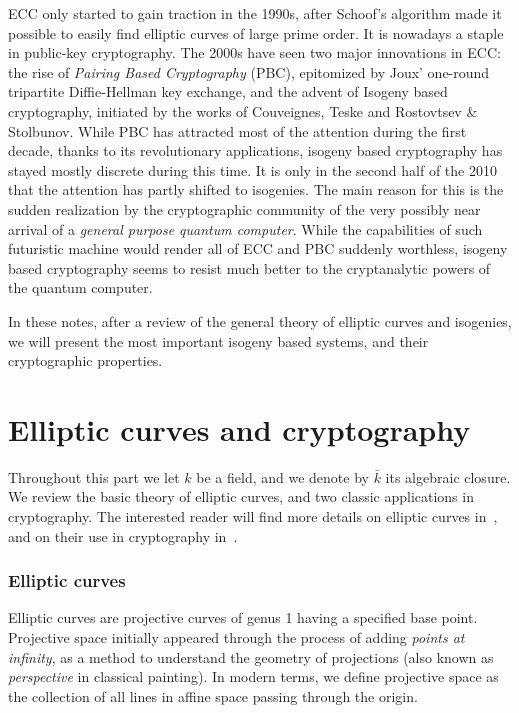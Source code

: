 \documentclass[10pt]{article}
\theoremstyle{plain}
\theoremstyle{definition}
\begin{document}
ECC only started to gain traction in the 1990s, after Schoof's
algorithm made it possible to easily find elliptic curves of large
prime order. %
It is nowadays a staple in public-key cryptography. %
The 2000s have seen two major innovations in ECC: the rise of
\emph{Pairing Based Cryptography} (PBC), epitomized by Joux' one-round
tripartite Diffie-Hellman key exchange, and the advent of
Isogeny based cryptography, initiated by the works of Couveignes,
Teske and Rostovtsev \& Stolbunov. %
While PBC has attracted most of the attention during the first decade,
thanks to its revolutionary applications, isogeny based cryptography
has stayed mostly discrete during this time. %
It is only in the second half of the 2010 that the attention has
partly shifted to isogenies. %
The main reason for this is the sudden realization by the
cryptographic community of the very possibly near arrival of a
\emph{general purpose quantum computer}. %
While the capabilities of such futuristic machine would render all of ECC
and PBC suddenly worthless, isogeny based cryptography seems to resist
much better to the cryptanalytic powers of the quantum computer.

In these notes, after a review of the general theory of elliptic
curves and isogenies, we will present the most important isogeny based
systems, and their cryptographic properties.

{
  \hypersetup{linkcolor=black}
  \setcounter{tocdepth}{1}
  \tableofcontents
}


\clearpage
\part{Elliptic curves and cryptography}

Throughout this part we let $k$ be a field, and we denote by
$\bar{k}$ its algebraic closure. %
We review the basic theory of elliptic curves, and two classic
applications in cryptography. %
The interested reader will find more details on elliptic curves
in~\cite{silverman:elliptic}, and on their use in cryptography
in~\cite{joux2009algorithmic,galbraith2012mathematics}.

\section{Elliptic curves}

Elliptic curves are projective curves of genus 1 having a specified
base point. %
Projective space initially appeared through the process of adding
\emph{points at infinity}, as a method to understand the geometry of
projections (also known as \emph{perspective} in classical
painting). %
In modern terms, we define projective space as the collection of all
lines in affine space passing through the origin.
\end{document}
